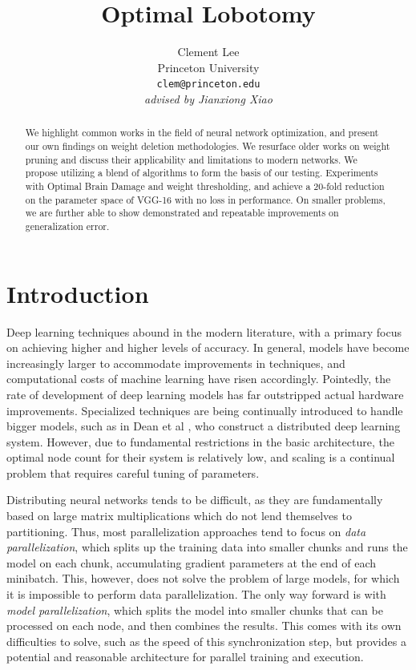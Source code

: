 \documentclass[10pt,twocolumn,letterpaper]{article}
\begin{document}
\title{Optimal Lobotomy}

\author{Clement Lee\\
  Princeton University\\
  {\tt\small clem@princeton.edu}\\
  \emph{advised by Jianxiong Xiao}
}
\maketitle

\begin{abstract}
  We highlight common works in the field of neural network optimization, and present our own findings on weight deletion methodologies.
  We resurface older works on weight pruning and discuss their applicability and limitations to modern networks.
  We propose utilizing a blend of algorithms to form the basis of our testing.
  Experiments with Optimal Brain Damage and weight thresholding, and achieve a 20-fold reduction on the parameter space of VGG-16 with no loss in performance.
  On smaller problems, we are further able to show demonstrated and repeatable improvements on generalization error.
\end{abstract}

\section{Introduction}

Deep learning techniques abound in the modern literature, with a primary focus on achieving higher and higher levels of accuracy.
In general, models have become increasingly larger to accommodate improvements in techniques, and computational costs of machine learning have risen accordingly.
Pointedly, the rate of development of deep learning models has far outstripped actual hardware improvements.
Specialized techniques are being continually introduced to handle bigger models, such as in Dean et al \cite{dean2012large}, who construct a distributed deep learning system.
However, due to fundamental restrictions in the basic architecture, the optimal node count for their system is relatively low, and scaling is a continual problem that requires careful tuning of parameters.

Distributing neural networks tends to be difficult, as they are fundamentally based on large matrix multiplications which do not lend themselves to partitioning.
Thus, most parallelization approaches tend to focus on \emph{data parallelization}, which splits up the training data into smaller chunks and runs the model on each chunk, accumulating gradient parameters at the end of each minibatch.
This, however, does not solve the problem of large models, for which it is impossible to perform data parallelization.
The only way forward is with \emph{model parallelization}, which splits the model into smaller chunks that can be processed on each node, and then combines the results.
This comes with its own difficulties to solve, such as the speed of this synchronization step, but provides a potential and reasonable architecture for parallel training and execution.
\end{document}
